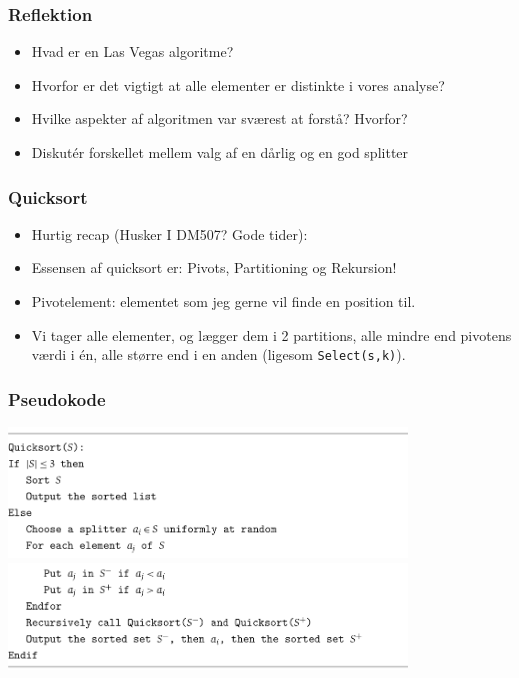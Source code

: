 \documentclass{beamer}
\begin{document}
\begin{frame}
  \frametitle{Reflektion}
  \begin{itemize}
  \item Hvad er en Las Vegas algoritme?
  \item Hvorfor er det vigtigt at alle elementer er distinkte i vores analyse? 
  \item Hvilke aspekter af algoritmen var sværest at forstå? Hvorfor?
  \item Diskutér forskellet mellem valg af en dårlig og en god splitter
  \end{itemize}
\end{frame}

\begin{frame}
  \frametitle{Quicksort}
  \begin{itemize}
    \item Hurtig recap (Husker I DM507? Gode tider):
    \item Essensen af quicksort er: Pivots, Partitioning og Rekursion! 
    \item Pivotelement: elementet som jeg gerne vil finde en position til. 
    \item Vi tager alle elementer, og lægger dem i 2 partitions, alle mindre end pivotens værdi i én, alle større end i en anden (ligesom \texttt{Select(s,k)}). 
  \end{itemize}
\end{frame}

\begin{frame}
  \frametitle{Pseudokode}
  \begin{center}
  \includegraphics[width=300pt]{main--randomized-divide-and-conquer-median-finding-and-quicksort--finding-the-median-3dc4.png} 
  \includegraphics[width=300pt]{main--randomized-divide-and-conquer-median-finding-and-quicksort--finding-the-median-a1e4.png}
  \end{center}
\end{frame}
\end{document}
